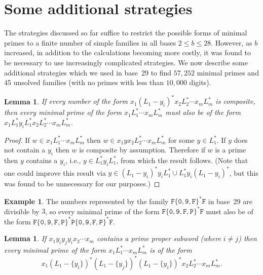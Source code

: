 \documentclass[12pt]{article}
\theoremstyle{plain}
\newtheorem{lemma}[theorem]{Lemma}
\theoremstyle{definition}
\newtheorem{example}[theorem]{Example}
\theoremstyle{remark}
\newcommand{\0}{\mathtt{0}}
\newcommand{\1}{\mathtt{1}}
\newcommand{\2}{\mathtt{2}}
\newcommand{\3}{\mathtt{3}}
\newcommand{\4}{\mathtt{4}}
\newcommand{\5}{\mathtt{5}}
\newcommand{\6}{\mathtt{6}}
\newcommand{\7}{\mathtt{7}}
\newcommand{\8}{\mathtt{8}}
\newcommand{\9}{\mathtt{9}}
\begin{document}
\section{Some additional strategies}\label{addstrat}

The strategies discussed so far suffice to restrict the possible forms of minimal primes to a finite number of simple families in all bases $2\leq b\leq 28$.
However, as $b$ increased, in addition to the calculations becoming more costly, 
it was found to be necessary to use increasingly complicated strategies.  
We now describe some additional strategies which we used in base~29 to find $57{,}252$ minimal primes
and 45 unsolved families (with no primes with less than $10{,}000$ digits).
\begin{lemma}
If every number of the form $x_1(L_1-y_i)^*x_2L_2^*\dotsm x_mL_m^*$ is composite, then
every minimal prime of the form $x_1L_1^*\dotsm x_mL_m^*$ must also be of the form
$x_1L_1^*y_iL_1^*x_2L_2^*\dotsm x_mL_m^*$.
\end{lemma}
\begin{proof}
If $w\in x_1L_1^*\dotsm x_mL_m^*$ then $w\in x_1yx_2L_2^*\dotsm x_mL_m^*$ for some $y\in L_1^*$.  If $y$ does not contain a $y_i$
then $w$ is composite by assumption.  Therefore if $w$ is a prime then $y$ contains a $y_i$, i.e., $y\in L_1^*y_iL_1^*$, from which the
result follows.
(Note that one could improve this result via $y\in(L_1-y_i)^*y_iL_1^*\cup L_1^*y_i(L_1-y_i)^*$, but this was found to be unnecessary for our purposes.)
\end{proof}
\begin{example}
The numbers represented by the family $\mathtt{F}\{\0,\9,\mathtt{F}\}^*\mathtt{F}$ in base~29 are divisible by $3$,
so every minimal prime of the form $\mathtt{F}\{\0,\9,\mathtt{F},\mathtt{P}\}^*\mathtt{F}$ must also be of the form
$\mathtt{F}\{\0,\9,\mathtt{F},\mathtt{P}\}^*\mathtt{P}\{\0,\9,\mathtt{F},\mathtt{P}\}^*\mathtt{F}$.
\end{example}
\begin{lemma}
If $x_1y_iy_jy_ix_2\dotsm x_m$ contains a prime proper subword (where $i\neq j$) then every minimal prime of the form
$x_1L_1^*\dotsm x_mL_m^*$ is of the form \[x_1(L_1-\{y_i\})^*(L_1-\{y_j\})^*(L_1-\{y_i\})^*x_2L_2^*\dotsm x_mL_m^* . \]
\end{lemma}
\end{document}

